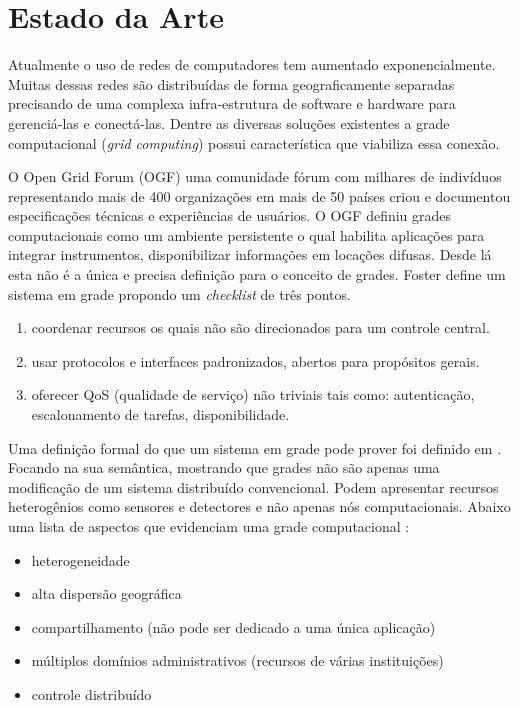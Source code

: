 \section{Estado da Arte}
\label{cap:estado da arte}

Atualmente o uso de redes de computadores tem aumentado exponencialmente. Muitas dessas redes são distribuídas de forma geograficamente separadas precisando de uma complexa infra-estrutura de software e hardware para gerenciá-las e conectá-las. Dentre as diversas soluções existentes a grade computacional (\emph{grid computing}) possui característica que viabiliza essa conexão.

O Open Grid Forum (OGF) uma comunidade fórum com milhares de indivíduos representando mais de 400 organizações em mais de 50 países criou e documentou \cite{M.2002} especificações técnicas e experiências de usuários. O OGF definiu grades computacionais como um ambiente persistente o qual habilita aplicações para integrar instrumentos, disponibilizar informações em locações difusas. Desde lá esta não é a única e precisa definição para o conceito de grades. Foster \cite{Kesselman2001} define um sistema em grade propondo um \emph{checklist} de três pontos.

\begin{enumerate}
	\item coordenar recursos os quais não são direcionados para um controle central.
	\item usar protocolos e interfaces padronizados, abertos para propósitos gerais.
	\item oferecer QoS (qualidade de serviço) não triviais tais como: autenticação, escalonamento de tarefas, disponibilidade.
\end{enumerate}

Uma definição formal do que um sistema em grade pode prover foi definido em \cite{Foster2002}. Focando na sua semântica, mostrando que grades não são apenas uma modificação de um sistema distribuído convencional. Podem apresentar recursos heterogênios como sensores e detectores e não apenas nós computacionais. Abaixo uma lista de aspectos que evidenciam uma grade computacional \cite{Cirne2002}:

\begin{itemize}
	\item heterogeneidade
	\item alta dispersão geográfica
	\item compartilhamento (não pode ser dedicado a uma única aplicação)
	\item múltiplos domínios administrativos (recursos de várias instituições)
	\item controle distribuído 
\end{itemize}

